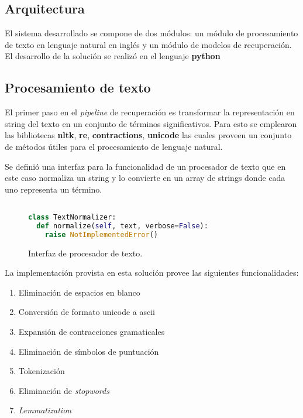 \documentclass[a4paper,10pt,twocolumn]{article}
\begin{document}
  	\subsection{Arquitectura}\label{sub:results}
	El sistema desarrollado se compone de dos m\'odulos: un m\'odulo de procesamiento
	de texto en lenguaje natural en ingl\'es y un m\'odulo de modelos de recuperaci\'on.
	El desarrollo de la soluci\'on se realiz\'o en el lenguaje \textbf{python}  


	\subsection{Procesamiento de texto}\label{sub:results}
	El primer paso en el \textit{pipeline} de recuperaci\'on es transformar la representaci\'on 
	en string del texto en un conjunto de t\'erminos significativos. Para esto se emplearon las bibliotecas
	\textbf{nltk}, \textbf{re}, \textbf{contractions}, \textbf{unicode} las cuales proveen un
	conjunto de m\'etodos \'utiles para el procesamiento de lenguaje natural.

	Se defini\'o una interfaz para la funcionalidad de un procesador de texto que en este caso
	normaliza un string y lo convierte en un array de strings donde cada uno representa un 
	t\'ermino.

	\begin{figure}[htb]%
		\begin{lstlisting}[language=python]%

class TextNormalizer:
  def normalize(self, text, verbose=False):
    raise NotImplementedError()

		\end{lstlisting}
	\caption{Interfaz de procesador de texto.\label{fig:code}}
	\end{figure}

	La implementaci\'on provista en esta soluci\'on provee las siguientes funcionalidades:
	\begin{enumerate}
		\item Eliminaci\'on de espacios en blanco
		\item Conversi\'on de formato unicode a ascii
		\item Expansi\'on de contracciones gramaticales
		\item Eliminaci\'on de s\'imbolos de puntuaci\'on
		\item Tokenizaci\'on
		\item Eliminaci\'on de \textit{stopwords}
		\item \textit{Lemmatization}
	\end{enumerate}
\end{document}
